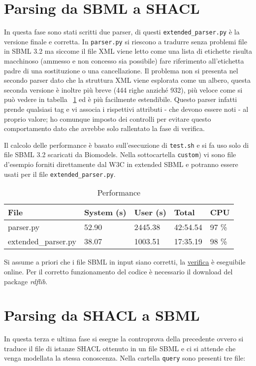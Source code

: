 \documentclass{article}
\begin{document}
\section{Parsing da SBML a SHACL}

In questa fase sono stati scritti due parser, di questi \texttt{extended\_parser.py} è la versione finale e corretta. In \texttt{parser.py} si riescono a tradurre senza problemi file in SBML 3.2 ma siccome il file XML viene letto come una lista di etichette risulta macchinoso (ammesso e non concesso sia possibile) fare riferimento all'etichetta padre di una sostituzione o una cancellazione. Il problema non si presenta nel secondo parser dato che la struttura XML viene esplorata come un albero, questa seconda versione è inoltre più breve (444 righe anziché 932), più veloce come si può vedere in tabella ~\ref{tab:performance} ed è più facilmente estendibile. Questo parser infatti prende qualsiasi tag e vi associa i rispettivi attributi - che devono essere noti - al proprio valore; ho comunque imposto dei controlli per evitare questo comportamento dato che avrebbe solo rallentato la fase di verifica.

Il calcolo delle performance è basato sull'esecuzione di \texttt{test.sh} e si fa uso solo di file SBML 3.2 scaricati da Biomodels. Nella sottocartella \texttt{custom}) vi sono file d'esempio forniti direttamente dal W3C in extended SBML e potranno essere usati per il file \texttt{extended\_parser.py}. 

\begin{table}[h!t] 
    \centering
    \begin{longtable}{p{3.3cm}p{2cm}p{1.5cm}p{1.5cm}p{1.5cm}}
        \textbf{File} & \textbf{System (s)} & \textbf{User (s)} & \textbf{Total} & \textbf{CPU} \\
        \hline
        parser.py & 52.90 & 2445.38 & 42:54.54 & 97 \% \\
        extended\_parser.py & 38.07 & 1003.51 & 17:35.19 & 98 \% \\
        \hline
    \end{longtable}
    \caption{Performance}
    \label{tab:performance}
\end{table}

Si assume a priori che i file SBML in input siano corretti, la \href{http://sbml.org/Facilities/Validator}{verifica} è eseguibile online. Per il corretto funzionamento del codice è necessario il download del package \textit{rdflib}.

\section{Parsing da SHACL a SBML}
In questa terza e ultima fase si esegue la controprova della precedente ovvero si traduce il file di istanze SHACL ottenuto in un file SBML e ci si attende che venga modellata la stessa conoscenza. Nella cartella \texttt{query} sono presenti tre file:
\end{document}
